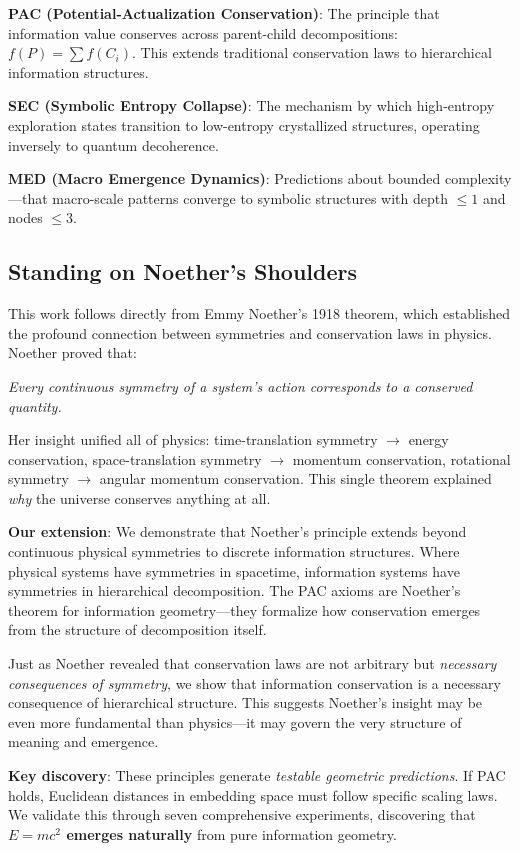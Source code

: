 \documentclass[11pt,a4paper]{article}
\begin{document}
\textbf{PAC (Potential-Actualization Conservation)}: The principle that information value conserves across parent-child decompositions: $f(P) = \sum f(C_i)$. This extends traditional conservation laws to hierarchical information structures.

\textbf{SEC (Symbolic Entropy Collapse)}: The mechanism by which high-entropy exploration states transition to low-entropy crystallized structures, operating inversely to quantum decoherence.

\textbf{MED (Macro Emergence Dynamics)}: Predictions about bounded complexity---that macro-scale patterns converge to symbolic structures with depth $\leq 1$ and nodes $\leq 3$.

\subsection{Standing on Noether's Shoulders}

This work follows directly from Emmy Noether's 1918 theorem, which established the profound connection between symmetries and conservation laws in physics. Noether proved that:

\begin{center}
\emph{Every continuous symmetry of a system's action corresponds to a conserved quantity.}
\end{center}

Her insight unified all of physics: time-translation symmetry $\to$ energy conservation, space-translation symmetry $\to$ momentum conservation, rotational symmetry $\to$ angular momentum conservation. This single theorem explained \emph{why} the universe conserves anything at all.

\textbf{Our extension}: We demonstrate that Noether's principle extends beyond continuous physical symmetries to discrete information structures. Where physical systems have symmetries in spacetime, information systems have symmetries in hierarchical decomposition. The PAC axioms are Noether's theorem for information geometry---they formalize how conservation emerges from the structure of decomposition itself.

Just as Noether revealed that conservation laws are not arbitrary but \emph{necessary consequences of symmetry}, we show that information conservation is a necessary consequence of hierarchical structure. This suggests Noether's insight may be even more fundamental than physics---it may govern the very structure of meaning and emergence.

\textbf{Key discovery}: These principles generate \emph{testable geometric predictions}. If PAC holds, Euclidean distances in embedding space must follow specific scaling laws. We validate this through seven comprehensive experiments, discovering that \textbf{$E=mc^2$ emerges naturally} from pure information geometry.
\end{document}

